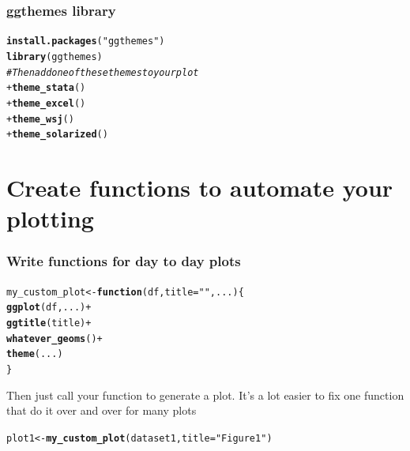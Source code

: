 \documentclass{beamer}\usepackage[]{graphicx}\usepackage[]{color}
\makeatletter
\newcommand{\hlstr}[1]{\textcolor[rgb]{0.192,0.494,0.8}{#1}}%
\newcommand{\hlcom}[1]{\textcolor[rgb]{0.678,0.584,0.686}{\textit{#1}}}%
\newcommand{\hlopt}[1]{\textcolor[rgb]{0,0,0}{#1}}%
\newcommand{\hlstd}[1]{\textcolor[rgb]{0.345,0.345,0.345}{#1}}%
\newcommand{\hlkwa}[1]{\textcolor[rgb]{0.161,0.373,0.58}{\textbf{#1}}}%
\newcommand{\hlkwb}[1]{\textcolor[rgb]{0.69,0.353,0.396}{#1}}%
\newcommand{\hlkwc}[1]{\textcolor[rgb]{0.333,0.667,0.333}{#1}}%
\newcommand{\hlkwd}[1]{\textcolor[rgb]{0.737,0.353,0.396}{\textbf{#1}}}%
\newenvironment{kframe}{%
 \def\at@end@of@kframe{}%
 \ifinner\ifhmode%
  \def\at@end@of@kframe{\end{minipage}}%
  \begin{minipage}{\columnwidth}%
 \fi\fi%
 \def\FrameCommand##1{\hskip\@totalleftmargin \hskip-\fboxsep
 \colorbox{shadecolor}{##1}\hskip-\fboxsep
     \hskip-\linewidth \hskip-\@totalleftmargin \hskip\columnwidth}%
 \MakeFramed {\advance\hsize-\width
   \@totalleftmargin\z@ \linewidth\hsize
   \@setminipage}}%
 {\par\unskip\endMakeFramed%
 \at@end@of@kframe}
\newenvironment{knitrout}{}{} %
\makeatother
\begin{document}

\begin{frame}[fragile]
\frametitle{ggthemes library}
\begin{knitrout}\footnotesize
{}\color{fgcolor}\begin{kframe}
\begin{alltt}
\hlkwd{install.packages}\hlstd{(}\hlstr{"ggthemes"}\hlstd{)}
\hlkwd{library}\hlstd{(ggthemes)}
\hlcom{# Then add one of these themes to your plot}
\hlopt{+}\hlkwd{theme_stata}\hlstd{()}
\hlopt{+}\hlkwd{theme_excel}\hlstd{()}
\hlopt{+}\hlkwd{theme_wsj}\hlstd{()}
\hlopt{+}\hlkwd{theme_solarized}\hlstd{()}
\end{alltt}
\end{kframe}
\end{knitrout}

\end{frame}


\section*{Create functions to automate your plotting}
\frame{\sectionpage}


\begin{frame}[fragile]
\frametitle{Write functions for day to day plots}
\begin{knitrout}\footnotesize
{}\color{fgcolor}\begin{kframe}
\begin{alltt}
\hlstd{my_custom_plot} \hlkwb{<-} \hlkwa{function}\hlstd{(}\hlkwc{df}\hlstd{,} \hlkwc{title} \hlstd{=} \hlstr{""}\hlstd{,} \hlkwc{...}\hlstd{) \{}
    \hlkwd{ggplot}\hlstd{(df, ...)} \hlopt{+}
    \hlkwd{ggtitle}\hlstd{(title)} \hlopt{+}
    \hlkwd{whatever_geoms}\hlstd{()} \hlopt{+}
    \hlkwd{theme}\hlstd{(...)}
\hlstd{\}}
\end{alltt}
\end{kframe}
\end{knitrout}


Then just call your function to generate a plot.
It's a lot easier to fix one function that do it over and over for many plots
\begin{knitrout}\footnotesize
{}\color{fgcolor}\begin{kframe}
\begin{alltt}
\hlstd{plot1} \hlkwb{<-} \hlkwd{my_custom_plot}\hlstd{(dataset1,} \hlkwc{title} \hlstd{=} \hlstr{"Figure 1"}\hlstd{)}
\end{alltt}
\end{kframe}
\end{knitrout}


\end{frame}
\end{document}
